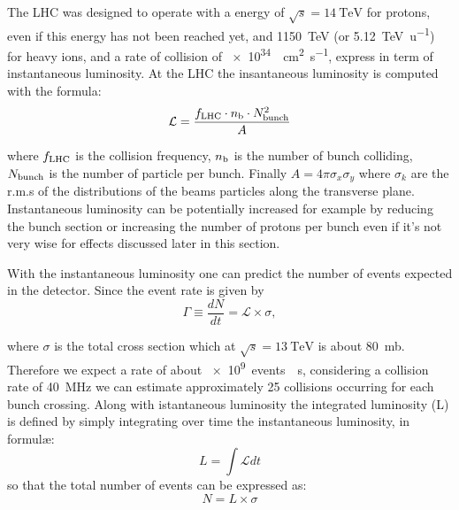 The LHC was designed to operate with a \cm energy of $\sqrt{s}=\SI{14}{\TeV} $ for protons, even if this energy has not been reached yet, and \SI{1150}{\TeV} (or \SI{5.12}{\TeV\per\amu}) for heavy ions, and a rate of collision of \SI{e34}{\per \cm \squared \per \s}, express in term of instantaneous luminosity. 
At the LHC the insantaneous luminosity is computed with the formula:
\begin{equation}
	\mathcal{L}=\frac{f_{\textup{LHC}} \cdot n_{\textup{b}} \cdot N_{\textup{bunch}}^2}{A}
\end{equation}

where $f_{\textup{LHC}}$ is the collision frequency, $n_{\textup{b}}$ is the number of bunch colliding, $N_{\textup{bunch}}$ is the number of particle per bunch. Finally $A=4\pi\sigma_x\sigma_y$ where $\sigma_k$ are the r.m.s of the distributions of the beams particles along the transverse plane. Instantaneous luminosity can be potentially increased for example by reducing the bunch section or increasing the number of protons per bunch even if it's not very wise for effects discussed later in this section.

With the instantaneous luminosity one can predict the number of events expected in the detector. Since the event rate is given by 
\begin{equation}
\Gamma\equiv\frac{dN}{dt}=\mathcal{L}\times\sigma,
\end{equation}

where $\sigma$ is the total \pp cross section which at $\sqrt{s}=\SI{13}{\TeV}$ is about \SI{80}{mb}. Therefore we expect a rate of about \SI{e9}{events \per\s}, considering a collision rate of \SI{40}{\MHz} we can estimate approximately 25 collisions occurring for each bunch crossing. Along with istantaneous luminosity the integrated luminosity (L) is defined by simply integrating over time the instantaneous luminosity, in formul\ae:
\begin{equation}
	L=\int{\mathcal{L}dt}
\end{equation} 
so that the total number of events can be expressed as:
\begin{equation}
N=L\times\sigma
\label{eqn:Nevents}
\end{equation}

